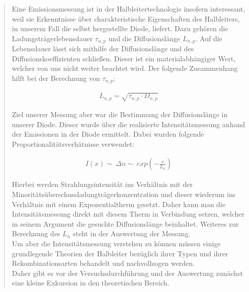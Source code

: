 \begin{quote}
    
    
    Eine Emissionsmessung ist in der Halbleitertechnologie insofern interessant,
    weil sie Erkenntnisse über charakteristische Eigenschaften des Halbleiters,
    in unserem Fall die selbst hergestellte Diode, liefert. Dazu gehören die
    Ladungsträgerlebensdauer $\tau_{n,p}$ und die Diffusionslänge $L_{n,p}$. Auf
    die Lebensdauer lässt sich mithilfe der Diffusionslänge und des
    Diffusionskoeffizienten schließen. Dieser ist ein materialabhängiger Wert,
    welcher von uns nicht weiter beachtet wird. Der folgende Zusammenhang hilft
    bei der Berechnung von $\tau_{n,p}$:
    
    \begin{equation*}
        \begin{split}
            L_{n,p} = \sqrt{\tau_{n,p} \cdot D_{n,p}} 
        \end{split}
    \end{equation*}
    
    Ziel unserer Messung aber war die Bestimmung der Diffusionslänge in unserer
    Diode. Dieser wurde über die realisierte Intensitätsmessung anhand der
    Emissionen in der Diode ermittelt. Dabei wurden folgende
    Proportionalitätsverhätnisse verwendet:
    
    \begin{equation*}
        \begin{split}
            I(x) \sim \ \Delta n \sim \ exp(-\frac{x}{L_n}) 
        \end{split}
    \end{equation*}
    
    Hierbei werden Strahlungsintensität ins Verhältnis mit der\\
    Minoritätsüberschussladungträgerkonzentration und dieser wiederum 
    ins Verhältnis mit einem Exponentialtherm gesetzt. Daher kann man die
    Intensitätsmessung direkt mit diesem Therm in Verbindung setzen, 
    welcher in seinem Argument die gesuchte Diffusionslänge beinhaltet. Weiteres
    zur Berechnung des $L_n$ steht in der Auswertung der Messung.\\
    
    Um aber die Intensitätsmessung verstehen zu können müssen einige
    grundlegende Theorien der Halbleiter bezüglich ihrer Typen und ihrer
    Rekombinationsarten behandelt und nachvollzogen werden.\\ 
    Daher gibt es vor der Versuchsdurchführung und der Auswertung zunächst eine
    kleine Exkursion in den theoretischen Bereich.
    

\end{quote}
